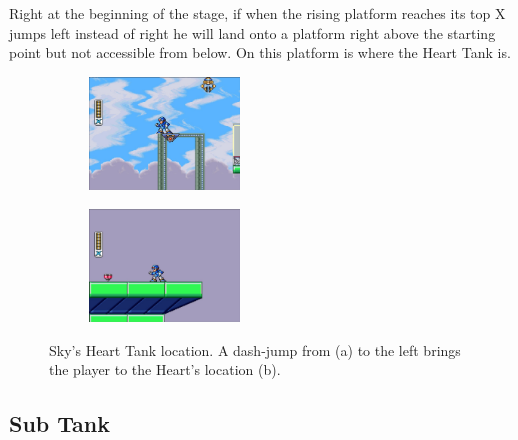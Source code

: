 Right at the beginning of the stage, if when the rising platform reaches its top X jumps left instead of right he will land onto a platform right above the starting point but not accessible from below. On this platform is where the Heart Tank is.
\begin{figure}[htp]
	\centering
	\begin{subfigure}{0.35\linewidth}
		\centering
		\includegraphics[height=3cm]{figures/X1/Storm_eagle/Storm_heart_1.jpg}
		\caption{}
	\end{subfigure}
	\begin{subfigure}{0.35\linewidth}
		\centering
		\includegraphics[height=3cm]{figures/X1/Storm_eagle/Storm_heart_2.jpg}
		\caption{}
	\end{subfigure}
	\caption{Sky's Heart Tank location. A dash-jump from (a) to the left brings the player to the Heart's location (b).}
\end{figure}

\subsection{Sub Tank}

